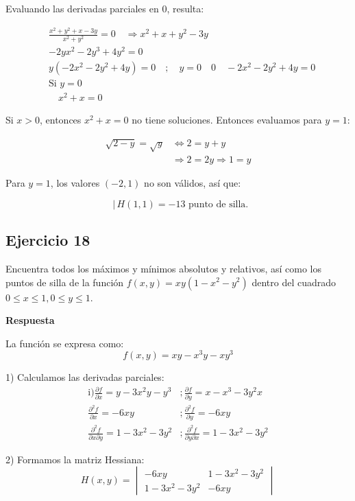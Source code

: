 \documentclass{report}
\begin{document}
Evaluando las derivadas parciales en $0$, resulta:

\[
\begin{aligned}
& \frac{x^{2}+y^{2}+x-3 y}{x^{2}+y^{2}}=0 \quad \Rightarrow x^{2}+x+y^{2}-3 y \\
& -2 y x^{2}-2 y^{3}+4 y^{2}=0 \\
& y\left(-2 x^{2}-2 y^{2}+4 y\right)=0 \quad ; \quad y=0 \quad 0 \quad -2 x^{2}-2 y^{2}+4 y=0 \\
& \text{Si } y=0 \\
& \quad x^{2}+x=0
\end{aligned}
\]

Si $x>0$, entonces $x^{2}+x=0$ no tiene soluciones. Entonces evaluamos para $y=1$:

\[
\begin{aligned}
\sqrt{2-y}=\sqrt{y} & \Leftrightarrow 2=y+y \\
& \Rightarrow 2=2 y \Rightarrow 1=y
\end{aligned}
\]

Para $y=1$, los valores $(-2,1)$ no son válidos, así que:

\[
\left.\begin{aligned}
\end{aligned} \right\rvert\, H(1,1)=-13 \text{ punto de silla. }
\]\subsection{Ejercicio 18} 
Encuentra todos los máximos y mínimos absolutos y relativos, así como los puntos de silla de la función $f(x, y)=x y\left(1-x^{2}-y^{2}\right)$ dentro del cuadrado $0 \leq x \leq 1, 0 \leq y \leq 1$.

\textbf{Respuesta}

La función se expresa como: 
$$
f(x, y)=x y - x^{3} y - x y^{3}
$$

1) Calculamos las derivadas parciales: 
$$
\begin{array}{ll}
\text{i)} \frac{\partial f}{\partial x} = y - 3 x^{2} y - y^{3} & ; \frac{\partial f}{\partial y} = x - x^{3} - 3 y^{2} x \\
\frac{\partial^{2} f}{\partial x} = -6 x y & ; \frac{\partial^{2} f}{\partial y} = -6 x y \\
\frac{\partial^{2} f}{\partial x \partial y} = 1 - 3 x^{2} - 3 y^{2} & ; \frac{\partial^{2} f}{\partial y \partial x} = 1 - 3 x^{2} - 3 y^{2}
\end{array}
$$

2) Formamos la matriz Hessiana:
$$
H(x, y) = \begin{vmatrix} 
-6 x y & 1 - 3 x^{2} - 3 y^{2} \\ 
1 - 3 x^{2} - 3 y^{2} & -6 x y 
\end{vmatrix}
$$
\end{document}
